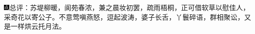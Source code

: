 {\includegraphics[width=3mm]{../Images/00005}总评：苏堤柳暖，阆苑春浓，兼之晨妆初罢，疏雨梧桐，正可借软草以慰佳人，采奇花以寄公子。不意莺嗔燕怒，逗起波涛，婆子长舌，丫鬟碎语，群相聚讼，又是一样烘云托月法。}



